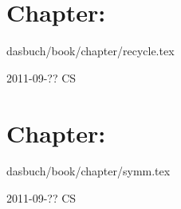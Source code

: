 \section{Chapter: }\noindent dasbuch/book/chapter/recycle.tex
\begin{description}\item[2011-09-?? CS]

\end{description}

\section{Chapter: }\noindent dasbuch/book/chapter/symm.tex
\begin{description}\item[2011-09-?? CS]

\end{description}

%
%
%
%
%
%
%
%


